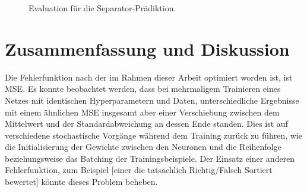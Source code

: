 \begin{figure}[h]
    \centering
	\caption{Evaluation für die Separator-Prädiktion.}
	\label{fig:boxplotErrorNNSeparator}
\end{figure}


\section{Zusammenfassung und Diskussion}


Die Fehlerfunktion nach der im Rahmen dieser Arbeit optimiert worden ist, ist MSE.
Es konnte beobachtet werden, dass bei mehrmaligem Trainieren eines Netzes 
mit identischen Hyperparametern und Daten, unterschiedliche Ergebnisse mit einem ähnlichen MSE insgesamt aber einer Verschiebung zwischen dem Mittelwert und der Standardabweichung  
an dessen Ende standen.
Dies ist auf verschiedene stochastische Vorgänge während dem Training zurück zu führen, wie die Initialisierung der Gewichte zwischen den Neuronen und die Reihenfolge beziehungsweise das Batching der Trainingsbeispiele.
Der Einsatz einer anderen Fehlerfunktion, zum Beispiel [einer die tatsächlich Richtig/Falsch Sortiert bewertet] könnte dieses Problem beheben.
